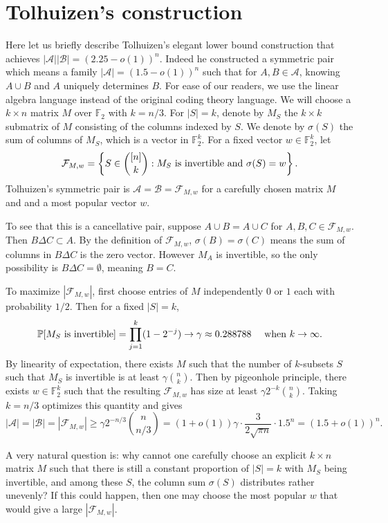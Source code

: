 \documentclass{article}
\begin{document}
\section{Tolhuizen's construction}
Here let us briefly describe Tolhuizen's elegant lower bound construction \cite{Tol2000} that achieves $|\mathcal{A}||\mathcal{B}|=(2.25-o(1))^n$. Indeed he constructed a symmetric pair which means a family $|\mathcal{A}|=(1.5-o(1))^n$ such that for $A, B \in \mathcal{A}$, knowing $A \cup B$ and $A$ uniquely determines $B$. For ease of our readers, we use the linear algebra language instead of the original coding theory language. We will choose a $k \times n$ matrix $M$ over $\mathbb{F}_2$ with $k=n/3$. For $|S|=k$, denote by $M_S$ the $k \times k$ submatrix of $M$ consisting of the columns indexed by $S$. We denote by $\sigma(S)$ the sum of columns of $M_S$, which is a vector in $\mathbb{F}_2^k$. For a fixed vector $w \in \mathbb{F}_2^k$, let 
$$\mathcal{F}_{M,w}=\left\{S \in \binom{[n]}{k}: M_S\textup{~is~invertible~and~}\sigma(S)=w\right\}.$$
Tolhuizen's symmetric pair is $\mathcal{A}=\mathcal{B}=\mathcal{F}_{M,w}$ for a carefully chosen matrix $M$ and and a most popular vector $w$. 

To see that this is a cancellative pair, suppose $A \cup B=A \cup C$ for $A,B,C \in \mathcal{F}_{M,w}$. Then $B \Delta C \subset A$. By the definition of $\mathcal{F}_{M,w}$, $\sigma(B)=\sigma(C)$ means the sum of columns in $B \Delta C$ is the zero vector. However $M_A$ is invertible, so the only possibility is $B \Delta C=\emptyset$, meaning $B=C$.

To maximize $|\mathcal{F}_{M,w}|$, first choose entries of  $M$ independently $0$ or $1$ each with probability $1/2$. Then for a fixed $|S|=k$, 
$$\mathbb{P}[M_S\textup{~is~invertible}]=\prod_{j=1}^k (1-2^{-j}) \rightarrow \gamma \approx 0.288788~~~~\textup{when~}k \rightarrow \infty.$$
By linearity of expectation, there exists $M$ such that the number of $k$-subsets $S$ such that $M_S$ is invertible is at least $\gamma \binom{n}{k}$. Then by pigeonhole principle, there exists $w \in \mathbb{F}_2^k$ such that the resulting $\mathcal{F}_{M,w}$ has size at least $\gamma 2^{-k} \binom{n}{k}$. Taking $k=n/3$ optimizes this quantity and gives 
$$|\mathcal{A}|=|\mathcal{B}|=|\mathcal{F}_{M,w}|\ge \gamma 2^{-n/3}\binom{n}{n/3}= (1+o(1))\gamma \cdot \frac{3}{2\sqrt{\pi n}}\cdot 1.5^n=(1.5+o(1))^n.$$

A very natural question is: why cannot one carefully choose an explicit $k \times n$ matrix $M$ such that there is still a constant proportion of $|S|=k$ with $M_S$ being invertible, and among these $S$, the column sum $\sigma(S)$ distributes rather unevenly? If this could happen, then one may choose the most popular $w$ that would give a large $|\mathcal{F}_{M,w}|$.
\end{document}
